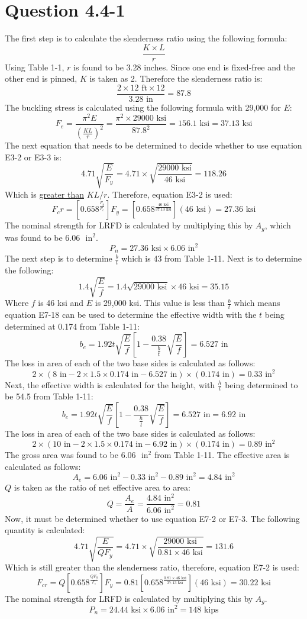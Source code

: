 \documentclass{article}
\begin{document}
\section*{Question 4.4-1}
The first step is to calculate the slenderness ratio using the following formula: 
\[\frac{K\times L}{r}\]
Using Table 1-1, $r$ is found to be 3.28 inches. Since one end is fixed-free and the other end is pinned, $K$ is taken as 2. Therefore the slenderness ratio is: 
\[\frac{2\times 12\text{ ft}\times 12}{3.28\text{ in}}=87.8\]
The buckling stress is calculated using the following formula with 29,000 for $E$: 
\[F_e=\frac{\pi^2E}{\left(\frac{KL}{r}\right)^2}=\frac{\pi^2\times29000\text{ ksi}}{87.8^2}=156.1\text{ ksi}=37.13\text{ ksi}\]
The next equation that needs to be determined to decide whether to use equation E3-2 or E3-3 is: 
\[4.71\sqrt{\frac{E}{F_y}}=4.71\times\sqrt{\frac{29000\text{ ksi}}{46\text{ ksi}}}=118.26\] 
Which is \underline{greater than} $KL/r$. Therefore, equation E3-2 is used: 
\[F_cr=\left[0.658^{\frac{F_y}{F_e}}\right]F_y=\left[0.658^{\frac{46\text{ ksi}}{37.13\text{ ksi}}}\right](46\text{ ksi})=27.36\text{ ksi}\]
The nominal strength for LRFD is calculated by multiplying this by $A_g$, which was found to be 6.06 $\text{ in}^2$. 
\[P_n=27.36\text{ ksi}\times6.06\text{ in}^2\]
The next step is to determine $\frac{b}{t}$ which is 43 from Table 1-11. Next is to determine the following: 
\[1.4\sqrt{\frac{E}{f}}=1.4\sqrt{29000\text{ ksi}}\times46\text{ ksi}=35.15\] 
Where $f$ is 46 ksi and $E$ is 29,000 ksi. This value is less than $\frac{b}{t}$ which means equation E7-18 can be used to determine the effective width with the $t$ being determined at 0.174 from Table 1-11: 
\[b_e=1.92t\sqrt{\frac{E}{f}}\left[1-\frac{0.38}{\frac{b}{t}}\sqrt{\frac{E}{f}}\right]=6.527\text{ in}\]
The loss in area of each of the two base sides is calculated as follows: 
\[2\times(8\text{ in}-2\times1.5\times0.174\text{ in}-6.527\text{ in})\times(0.174\text{ in})=0.33\text{ in}^2\]
Next, the effective width is calculated for the height, with $\frac{h}{t}$ being determined to be 54.5 from Table 1-11: 
\[b_e=1.92t\sqrt{\frac{E}{f}}\left[1-\frac{0.38}{\frac{h}{t}}\sqrt{\frac{E}{f}}\right]=6.527\text{ in}=6.92\text{ in}\]
The loss in area of each of the two base sides is calculated as follows: 
\[2\times(10\text{ in}-2\times1.5\times0.174\text{ in}-6.92\text{ in})\times(0.174\text{ in})=0.89\text{ in}^2\] 
The gross area was found to be 6.06 $\text{ in}^2$ from Table 1-11. The effective area is calculated as follows: 
\[A_e=6.06\text{ in}^2-0.33\text{ in}^2-0.89\text{ in}^2=4.84\text{ in}^2\] 
$Q$ is taken as the ratio of net effective area to area: 
\[Q=\frac{A_e}{A}=\frac{4.84\text{ in}^2}{6.06\text{ in}^2}=0.81\] 
Now, it must be determined whether to use equation E7-2 or E7-3. The following quantity is calculated: 
\[4.71\sqrt{\frac{E}{QF_y}}=4.71\times\sqrt{\frac{29000\text{ ksi}}{0.81\times46\text{ ksi}}}=131.6\]
Which is still greater than the slenderness ratio, therefore, equation E7-2 is used: 
\[F_{cr}=Q\left[0.658^{\frac{QF_y}{F_e}}\right]F_y=0.81\left[0.658^{\frac{0.81\times46\text{ ksi}}{37.13\text{ ksi}}}\right](46\text{ ksi})=30.22\text{ ksi}\] 
The nominal strength for LRFD is calculated by multiplying this by $A_g$. 
\[P_n=24.44\text{ ksi}\times6.06\text{ in}^2=\boxed{148\text{ kips}}\]
\newpage
\end{document}
